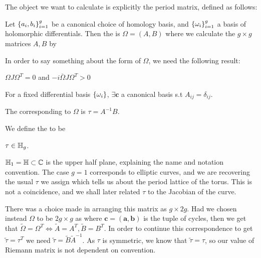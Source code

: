 \documentclass{article}
\begin{document}
The object we want to calculate is explicitly the period matrix, defined as follows:
\begin{definition}\label{def: period matrix}
	Let $\left\{ a_i, b_i \right\}_{i=1}^g$ be a canonical choice of homology basis, and $\left\{ \omega_i \right\}_{i=1}^g$ a basis of holomorphic differentials. Then the  is $\Omega = (A,B)$ where we calculate the $g\times g$ matrices $A,B$ by 
\end{definition}

In order to say something about the form of $\Omega$, we need the following result:
\begin{prop}
	$\Omega J \Omega^T = 0$ and $-i\bar{\Omega}J\Omega^T > 0$
\end{prop}
\begin{corollary}
	For a fixed differential basis $\left\{ \omega_i \right\}$, $\exists \bm{c}$ a canonical basis s.t $A_{ij} = \delta_{ij}$. 
\end{corollary}

\begin{definition}
	The  corresponding to $\Omega$ is $\tau = A^{-1}B$. 
\end{definition}

\begin{definition}\label{def: Siegel upper half space}
	We define the  to be 
\end{definition}

\begin{lemma} $\tau \in \mathbb{H}_g$.  
\end{lemma}

\begin{example}
	$\mathbb{H}_1 = \mathbb{H} \subset \mathbb{C}$ is the upper half plane, explaining the name and notation convention. The case $g=1$ corresponds to elliptic curves, and we are recovering the usual $\tau$ we assign which tells us about the period lattice of the torus. This is not a coincidence, and we shall later related $\tau$ to the Jacobian of the curve. 
\end{example}


\begin{remark}
	There was a choice made in arranging this matrix as $g \times 2g$. Had we chosen instead $\Omega$ to be $2g \times g$ as 
	where $\bm{c} = (\bm{a},\bm{b})$ is the tuple of cycles, then we get that $\tilde{\Omega} = \Omega^T \Leftrightarrow \tilde{A}=A^T, \tilde{B} = B^T$. In order to continue this correspondence to get $\tilde{\tau} = \tau^T$ we need $\tilde{\tau} = \tilde{B} \tilde{A}^{-1}$. As $\tau$ is symmetric, we know that $\tilde{\tau} = \tau$, so our value of Riemann matrix is not dependent on convention. 
\end{remark}
\end{document}
